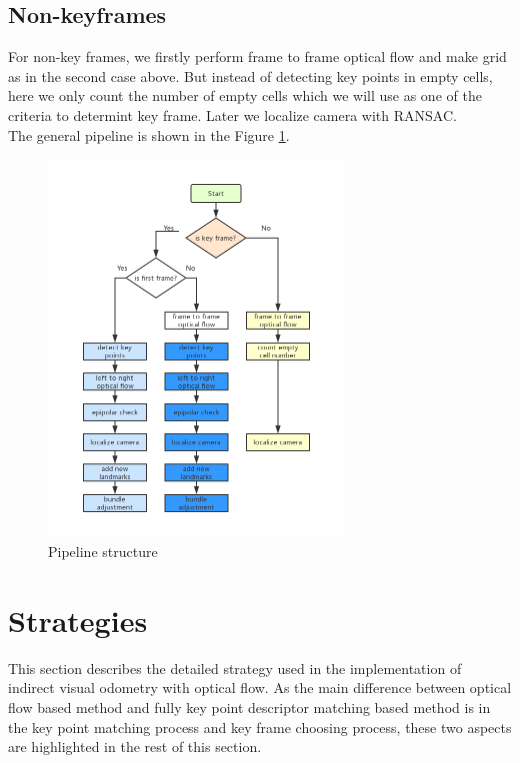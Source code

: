 \documentclass{easychair}
\begin{document}
\subsection{Non-keyframes}
For non-key frames, we firstly perform frame to frame optical flow and make grid as in the second case above. But instead of detecting key points in empty cells, here we only count the number of empty cells which we will use as one of the criteria to determint key frame. Later we localize camera with RANSAC.\\

The general pipeline is shown in the Figure \ref{fig:pipeline structure}.

\begin{figure}[h!]
	\centering
	\includegraphics[width=0.7\textwidth]{img/flowchart.png}
	\caption{Pipeline structure}
	\label{fig:pipeline structure}
\end{figure}



\section{Strategies}
This section describes the detailed strategy used in the implementation of indirect visual odometry with optical flow. As the main difference between optical flow based method and fully key point descriptor matching based method is in the key point matching process and key frame choosing process, these two aspects are highlighted in the rest of this section.
\end{document}
